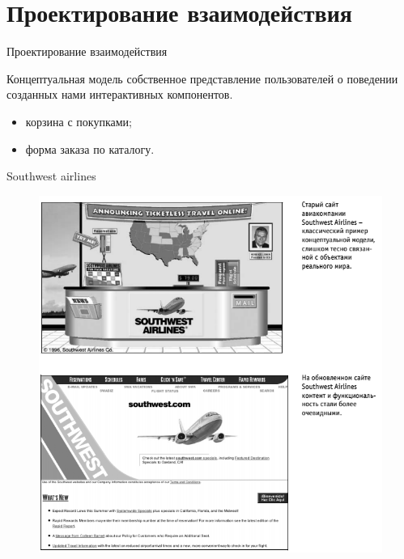\documentclass{beamer}
\begin{document}
\section{Проектирование взаимодействия}

\begin{frame}[t]{Проектирование взаимодействия}
\begin{block}{Концептуальная модель}
собственное представление пользователей о поведении созданных нами интерактивных компонентов. 
\end{block}
\begin{itemize}
	\item корзина с покупками;
	\item форма заказа по каталогу.
\end{itemize}
\end{frame} 

\begin{frame}[t]{Southwest airlines}
\begin{figure}[h]
\centering
\includegraphics[scale=0.4]{images/lec03-pic03.png}
\end{figure}
\end{frame} 
\end{document}
